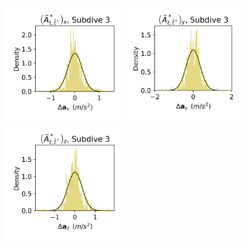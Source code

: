 \documentclass{article}
\begin{document}
\begin{center}
        \includegraphics[width=1.75in]{../Plots/2019/20190902-182840-CATs_OB_1_0_267_CarHHMM2_empirical_hist_Ax_2.png}
        \includegraphics[width=1.75in]{../Plots/2019/20190902-182840-CATs_OB_1_0_267_CarHHMM2_empirical_hist_Ay_2.png}
        \includegraphics[width=1.75in]{../Plots/2019/20190902-182840-CATs_OB_1_0_267_CarHHMM2_empirical_hist_Az_2.png}
        

\end{center}
\end{document}
